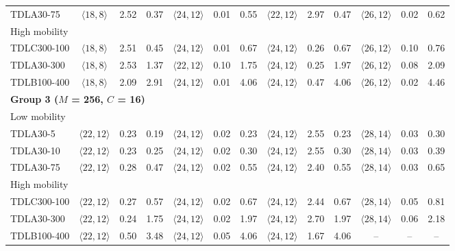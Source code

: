 \begin{table}[htbp]
\begin{tabular}{lcccccccccccc}
\quad TDLA30-75 & $\langle 18,8\rangle$ & 2.52 & 0.37 & $\langle 24,12\rangle$ & 0.01 & 0.55 & $\langle 22,12\rangle$ & 2.97 & 0.47 & $\langle 26,12\rangle$ & 0.02 & 0.62 \\
\multicolumn{13}{l}{High mobility} \\
\quad TDLC300-100 & $\langle 18,8\rangle$ & 2.51 & 0.45 & $\langle 24,12\rangle$ & 0.01 & 0.67 & $\langle 24,12\rangle$ & 0.26 & 0.67 & $\langle 26,12\rangle$ & 0.10 & 0.76 \\
\quad TDLA30-300 & $\langle 18,8\rangle$ & 2.53 & 1.37 & $\langle 22,12\rangle$ & 0.10 & 1.75 & $\langle 24,12\rangle$ & 0.25 & 1.97 & $\langle 26,12\rangle$ & 0.08 & 2.09 \\
\quad TDLB100-400 & $\langle 18,8\rangle$ & 2.09 & 2.91 & $\langle 24,12\rangle$ & 0.01 & 4.06 & $\langle 24,12\rangle$ & 0.47 & 4.06 & $\langle 26,12\rangle$ & 0.02 & 4.46 \\
\midrule
\multicolumn{13}{l}{\textbf{Group 3 ($M$ = 256, $C$ = 16)}} \\
\multicolumn{13}{l}{Low mobility} \\
\quad TDLA30-5 & $\langle 22,12\rangle$ & 0.23 & 0.19 & $\langle 24,12\rangle$ & 0.02 & 0.23 & $\langle 24,12\rangle$ & 2.55 & 0.23 & $\langle 28,14\rangle$ & 0.03 & 0.30 \\
\quad TDLA30-10 & $\langle 22,12\rangle$ & 0.23 & 0.25 & $\langle 24,12\rangle$ & 0.02 & 0.30 & $\langle 24,12\rangle$ & 2.55 & 0.30 & $\langle 28,14\rangle$ & 0.03 & 0.39 \\
\quad TDLA30-75 & $\langle 22,12\rangle$ & 0.28 & 0.47 & $\langle 24,12\rangle$ & 0.02 & 0.55 & $\langle 24,12\rangle$ & 2.40 & 0.55 & $\langle 28,14\rangle$ & 0.03 & 0.65 \\
\multicolumn{13}{l}{High mobility} \\
\quad TDLC300-100 & $\langle 22,12\rangle$ & 0.27 & 0.57 & $\langle 24,12\rangle$ & 0.02 & 0.67 & $\langle 24,12\rangle$ & 2.44 & 0.67 & $\langle 28,14\rangle$ & 0.05 & 0.81 \\
\quad TDLA30-300 & $\langle 22,12\rangle$ & 0.24 & 1.75 & $\langle 24,12\rangle$ & 0.02 & 1.97 & $\langle 24,12\rangle$ & 2.70 & 1.97 & $\langle 28,14\rangle$ & 0.06 & 2.18 \\
\quad TDLB100-400 & $\langle 22,12\rangle$ & 0.50 & 3.48 & $\langle 24,12\rangle$ & 0.05 & 4.06 & $\langle 24,12\rangle$ & 1.67 & 4.06 & -- & -- & -- \\
\bottomrule
\end{tabular}
\vspace{4pt}
\end{table}

